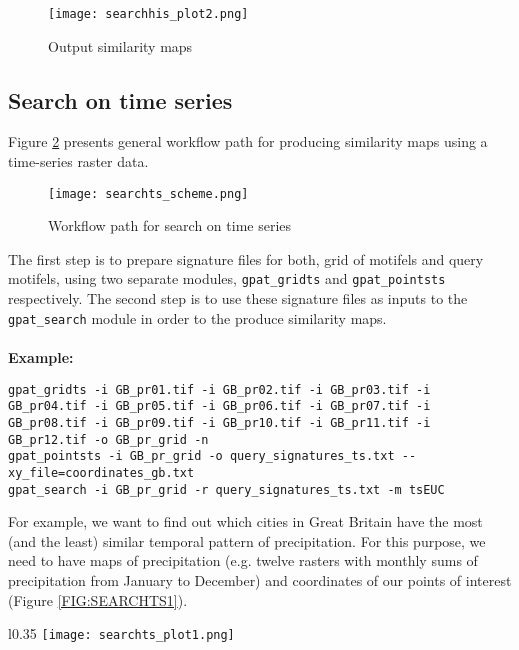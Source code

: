 \begin{figure}[H]
	\centering
	\texttt{[image: searchhis\_plot2.png]}
	\caption{Output similarity maps}
	\label{FIG:SEARCH2}
\end{figure}

\FloatBarrier

\subsection{Search on time series}
Figure \ref{FIG:SEARCHTS} presents general workflow path for producing similarity maps using a time-series raster data. 

\begin{figure}[H]
	\centering
	\texttt{[image: searchts\_scheme.png]}
	\caption{Workflow path for search on time series}
	\label{FIG:SEARCHTS}
\end{figure}

The first step is to prepare signature files for both, grid of motifels and query motifels, using two separate modules, {\tt gpat\_gridts} and {\tt gpat\_pointsts} respectively. 
The second step is to use these signature files as inputs to the {\tt gpat\_search} module in order to the produce similarity maps.\\\\

{\bf Example:}

\begin{minipage}{\linewidth}
\begin{lstlisting}
gpat_gridts -i GB_pr01.tif -i GB_pr02.tif -i GB_pr03.tif -i GB_pr04.tif -i GB_pr05.tif -i GB_pr06.tif -i GB_pr07.tif -i GB_pr08.tif -i GB_pr09.tif -i GB_pr10.tif -i GB_pr11.tif -i GB_pr12.tif -o GB_pr_grid -n
gpat_pointsts -i GB_pr_grid -o query_signatures_ts.txt --xy_file=coordinates_gb.txt
gpat_search -i GB_pr_grid -r query_signatures_ts.txt -m tsEUC
\end{lstlisting}
\end{minipage}

For example, we want to find out which cities in Great Britain have the most (and the least) similar temporal pattern of precipitation. 
For this purpose, we need to have maps of precipitation (e.g. twelve rasters with monthly sums of precipitation from January to December) and coordinates of our points of interest (Figure \ref{FIG:SEARCHTS1}).

\newpage

\begin{wrapfigure}{l}{0.35\textwidth}
	\texttt{[image: searchts\_plot1.png]}
	\caption{Location of the points of interest}
	\label{FIG:SEARCHTS1}
\end{wrapfigure}

